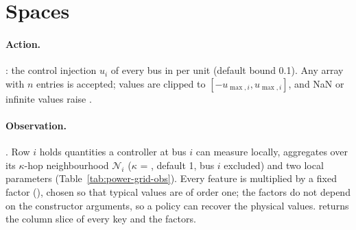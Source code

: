 \section{Spaces}\label{sec:power-grid-spaces}

\paragraph{Action.} : the control
injection $u_i$ of every bus in per unit (default bound 0.1). Any array with $n$
entries is accepted; values are clipped to $[-u_{\max,i}, u_{\max,i}]$, and NaN or
infinite values raise .

\paragraph{Observation.} . Row $i$ holds
quantities a controller at bus $i$ can measure locally, aggregates over its
$\kappa$-hop neighbourhood $\mathcal{N}_i$ ($\kappa$ = ,
default 1, bus $i$ excluded) and two local parameters
(Table~\ref{tab:power-grid-obs}). Every feature is multiplied by a fixed factor
(), chosen so that typical values are of order one; the
factors do not depend on the constructor arguments, so a policy can recover the
physical values.  returns the column slice of
every key and  the factors.

